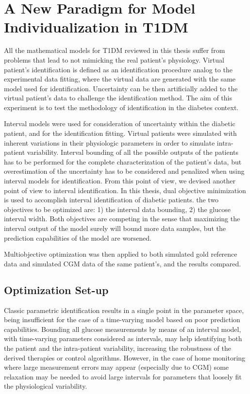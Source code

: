 
\chapter{A New Paradigm for Model Individualization in T1DM}
\label{sec:InSilicoIdentification}

All the mathematical models for T1DM reviewed in this thesis suffer from problems that lead to not mimicking the real patient's physiology. Virtual patient's identification is defined as an identification procedure analog to the experimental data fitting, where the virtual data are generated with the same model used for identification. Uncertainty can be then artificially added to the virtual patient's data to challenge the identification method. The aim of this experiment is to test the methodology of identification in the diabetes context.

Interval models were used for consideration of uncertainty within the diabetic patient, and for the identification fitting. Virtual patients were simulated with inherent variations in their physiologic parameters in order to simulate intra-patient variability. Interval bounding of all the possible outputs of the patients has to be performed for the complete characterization of the patient's data, but overestimation of the uncertainty has to be considered and penalized when using interval models for identification.  From this point of view, we devised another point of view to interval identification. In this thesis, dual objective minimization is used to accomplish interval identification of diabetic patients. the two objectives to be optimized are: 1) the interval data bounding, 2) the glucose interval width. Both objectives are competing in the sense that maximizing the interval output of the model surely will bound more data samples, but the prediction capabilities of the model are worsened.

Multiobjective optimization was then applied to both simulated gold reference data and simulated CGM data of the same patient's, and the results compared.

\section{Optimization Set-up}
\label{sec:MultiobjectiveOptimizationSetUp}

Classic parametric identification results in a single point in the parameter space, being insufficient for the case of a time-varying model based on poor prediction capabilities. Bounding all glucose measurements by means of an interval model, with time-varying parameters considered as intervals, may help identifying both the patient and the intra-patient variability, increasing the robustness of the derived therapies or control algorithms. However, in the case of home monitoring where large measurement errors may appear (especially due to CGM) some relaxation may be needed to avoid large intervals for parameters that loosely fit the physiological variability. 

